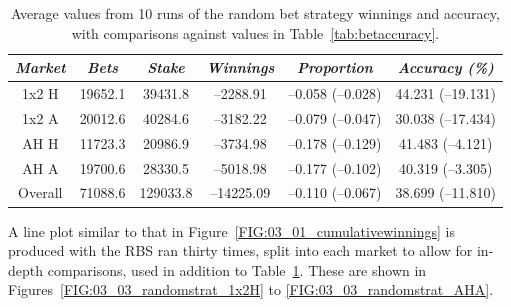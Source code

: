 \documentclass[a4paper,10pt]{report}
\begin{document}
\begin{table}[h!]\begin{center}\begin{tabular}{c||cc|cc|c}
	\textit{Market}	& \textit{Bets} & \textit{Stake}	& \textit{Winnings}	& \textit{Proportion}& \textit{Accuracy (\%)}  \\ \hline\hline
1x2 H	&19652.1	&39431.8	&--2288.91	&--0.058 (--0.028)	&44.231 (--19.131)
\\
1x2 A	&20012.6	&40284.6	&--3182.22	&--0.079 (--0.047)	&30.038 (--17.434) \\
AH H	&11723.3	&20986.9	&--3734.98	&--0.178 (--0.129)	&41.483 (--4.121)  \\
AH A	&19700.6	&28330.5	&--5018.98	&--0.177 (--0.102)	&40.319 (--3.305)
 \\ \hdashline
Overall	&71088.6	&129033.8	&--14225.09	&--0.110 (--0.067)	&38.699 (--11.810) 
\end{tabular}\end{center}\caption{Average values from 10 runs of the random bet strategy winnings and accuracy, with comparisons against values in Table~\ref{tab:betaccuracy}.}\label{tab:randombetstrategy}
\end{table}

A line plot similar to that in Figure~\ref{FIG:03_01_cumulativewinnings} is produced with the RBS ran thirty times, split into each market to allow for in-depth comparisons, used in addition to Table~\ref{tab:randombetstrategy}. These are shown in Figures~\ref{FIG:03_03_randomstrat_1x2H} to \ref{FIG:03_03_randomstrat_AHA}.

\pagebreak
\end{document}
